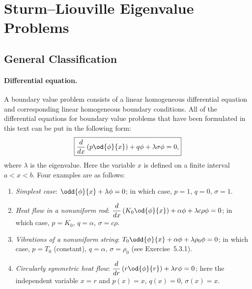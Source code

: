 \section{Sturm--Liouville Eigenvalue Problems}
\label{sec:sl-eigenvalue}

\subsection{General Classification}
\label{subsec:sl-classification}

\paragraph{Differential equation.}
A boundary value problem consists of a linear homogeneous differential equation and corresponding linear homogeneous boundary conditions.  All of the differential equations for boundary value problems that have been formulated in this text can be put in the following form:
\begin{equation}
\label{eq:sl-general}
\boxed{\frac{d}{d x}\left(p\od{\phi}{x}\right) + q\phi + \lambda\sigma\phi = 0,}
\end{equation}
where $\lambda$ is the eigenvalue.  Here the variable $x$ is defined on a finite interval $a < x < b$.  Four examples are as follows:
\begin{enumerate}
\item \textit{Simplest case}: $\displaystyle\odd{\phi}{x} + \lambda\phi = 0$; in which case, $p = 1$, $q = 0$, $\sigma = 1$.

\item \textit{Heat flow in a nonuniform rod}: $\displaystyle\frac{d}{d x}\left(K_0\od{\phi}{x}\right) + \alpha\phi + \lambda c\rho\phi = 0$; in which case, $p = K_0$, $q = \alpha$, $\sigma = c\rho$.

\item \textit{Vibrations of a nonuniform string}: $\displaystyle T_0\odd{\phi}{x} + \alpha\phi + \lambda\rho_0\phi = 0$; in which case, $p = T_0$ (constant), $q = \alpha$, $\sigma = \rho_0$ (see Exercise~5.3.1).

\item \textit{Circularly symmetric heat flow}: $\displaystyle\frac{d}{d r}\left(r\od{\phi}{r}\right) + \lambda r\phi = 0$; here the independent variable $x = r$ and $p(x) = x$, $q(x) = 0$, $\sigma(x) = x$.
\end{enumerate}

